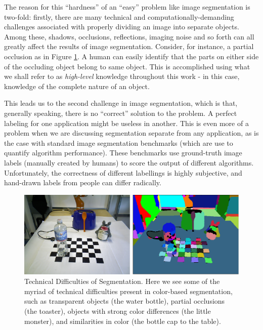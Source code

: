 The reason for this ``hardness'' of an ``easy'' problem like image segmentation is two-fold: firstly, there are many technical and computationally-demanding challenges associated with properly dividing an image into separate objects. Among these, shadows, occlusions, reflections, imaging noise and so forth can all greatly affect the results of image segmentation. Consider, for instance, a partial occlusion as in Figure \ref{fig:SegmentationProblems}. A human can easily identify that the parts on either side of the occluding object belong to same object. This is accomplished using what we shall refer to as \emph{high-level} knowledge throughout this work - in this case, knowledge of the complete nature of an object.

This leads us to the second challenge in image segmentation, which is that, generally speaking, there is no ``correct'' solution to the problem. A perfect labeling for one application might be useless in another. This is even more of a problem when we are discussing segmentation separate from any application, as is the case with standard image segmentation benchmarks (which are use to quantify algorithm performance). These benchmarks use ground-truth image labels (manually created by humans) to score the output of different algorithms. Unfortunately, the correctness of different labellings is highly subjective, and hand-drawn labels from  people can differ radically.

\begin{figure}
\centering
\includegraphics[width=\linewidth]{figures/Introduction/Segmentation_Problems.pdf}
\caption[Technical Difficulties of Segmentation]{Technical Difficulties of Segmentation. Here we see some of the myriad of technical difficulties present in color-based segmentation, such as transparent objects (the water bottle), partial occlusions (the toaster), objects with strong color differences (the little monster), and similarities in color (the bottle cap to the table).}
\label{fig:SegmentationProblems}
\end{figure}



